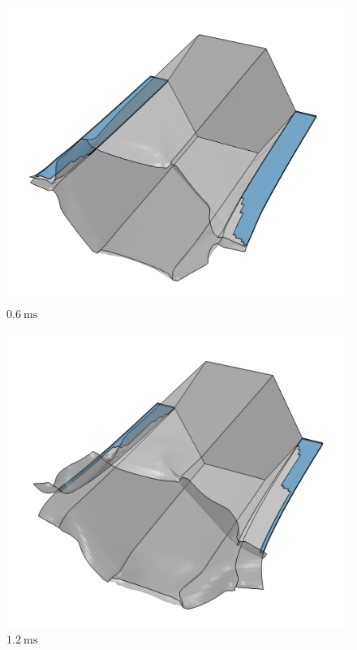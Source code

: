 \documentclass[
documentsize = a4, %
font = cmr, %
typesize = 11, %
printmode = true,
onehalfspacing = true,
language = en, %
titlepage = udciccp, %
degree = pt, %
dedication = true,
acknowledgements = true,
abstract-en = true,
abstract-es = false,
abstract-ga = false,
epigraphs = true,
toc = true,
lof = true,
lot = true,
frontmatterintoc = false,
notation = false,
minimal = false,
]{UDCthesis}
\begin{document}
\begin{figure}
	\centering
	\begin{minipage}[b]{.3\linewidth}
		\centering
		\includegraphics[width=\linewidth]{IMG_CUTRES/hex1}
		$\SI{0.6}{\ms}$
	\end{minipage}
	\quad
	\begin{minipage}[b]{.3\linewidth}
		\centering
		\includegraphics[width=\linewidth]{IMG_CUTRES/hex2}
		$\SI{1.2}{\ms}$
	\end{minipage}

\end{figure}
\end{document}
